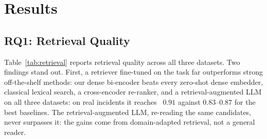 \section{Results}
\label{sec:results}

\subsection{RQ1: Retrieval Quality}
\label{sec:results-rq1}

Table~\ref{tab:retrieval} reports retrieval quality across all three datasets.
Two findings stand out. First, a retriever fine-tuned on the task far
outperforms strong off-the-shelf methods: our dense bi-encoder beats every
zero-shot dense embedder, classical lexical search, a cross-encoder re-ranker,
and a retrieval-augmented LLM on all three datasets: on real incidents it reaches ~$0.91$ against $0.83$--$0.87$ for the best baselines.
The retrieval-augmented LLM, re-reading the same candidates, never surpasses it:
the gains come from domain-adapted retrieval, not a general reader.


